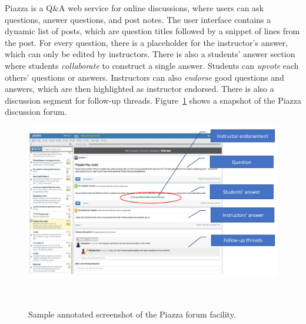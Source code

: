 Piazza is a Q\&A web service for online discussions, where users can
ask questions, answer questions, and post notes. The user interface contains a dynamic list of
posts, which are question titles followed by a snippet of lines from
the post. 
For every question, there is a placeholder for the
instructor's answer, which can only be edited by
instructors. There is also a students' answer section where students
{\em collaborate} to construct a single answer. Students can {\em upvote} each others' questions or answers. Instructors can also {\em endorse} good questions and answers, which are then highlighted as instructor endorsed. There is also a discussion segment for follow-up threads.
Figure~\ref{fig:piazza} shows a snapshot of the Piazza discussion forum.

\begin{figure}
\centering
\includegraphics[width=1.0\columnwidth]{Figs/Piazza4.png}
  \caption{Sample annotated screenshot of the Piazza forum facility.}
  ~\label{fig:piazza}
\end{figure}




